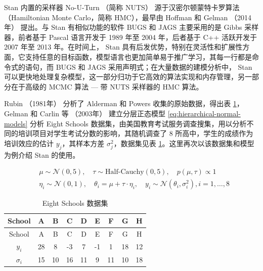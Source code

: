\documentclass[12pt,a4paper,UTF8,twoside]{book}
\theoremstyle{definition}
\theoremstyle{definition}
\theoremstyle{definition}
\theoremstyle{remark}
\begin{document}
Stan 内置的采样器 No-U-Turn （简称 NUTS） 源于汉密尔顿蒙特卡罗算法 （Hamiltonian Monte Carlo，简称 HMC），最早由 Hoffman 和 Gelman （2014年） \citep{hoffman2014} 提出。与 Stan 有相似功能的软件 BUGS 和 JAGS 主要采用的是 Gibbs 采样器，前者基于 Pascal 语言开发于 1989 年至 2004 年，后者基于 C++ 活跃开发于 2007 年至 2013 年。在时间上， Stan 具有后发优势，特别在灵活性和扩展性方面，它支持任意的目标函数，模型语言也更加简单易于推广学习，其每一行都是命令式的语句，而 BUGS 和 JAGS 采用声明式；在大量数据的建模分析中， Stan 可以更快地处理复杂模型，这一部分归功于它高效的算法实现和内存管理，另一部分在于高级的 MCMC 算法 --- 带 NUTS 采样器的 HMC 算法。

Rubin （1981年） \citep{Rubin1981} 分析了 Alderman 和 Powers \citep{Alderman1980} 收集的原始数据，得出表 \ref{tab:eight-high-schools}， Gelman 和 Carlin 等 （2003年） \citep{Gelman2003} 建立分层正态模型 \eqref{eq:hierarchical-normal-models} 分析 Eight Schools 数据集，由美国教育考试服务调查搜集，用以分析不同的培训项目对学生考试分数的影响，其随机调查了 8 所高中，学生的成绩作为培训效应的估计 \(y_j\)，其样本方差 \(\sigma^2_j\)，数据集见表 \ref{tab:eight-high-schools}。这里再次以该数据集和模型为例介绍 Stan 的使用。

\begin{equation}
\begin{aligned}
    &{} \mu \sim \mathcal{N}(0,5), \quad \tau \sim \text{Half-Cauchy}(0,5), \quad p(\mu,\tau) \propto 1 \\
    &{} \eta_i \sim \mathcal{N}(0,1), \quad
        \theta_i  =   \mu + \tau \cdot \eta_i, \quad 
        y_i \sim \mathcal{N}(\theta_i,\sigma^2_{i}), i = 1,\ldots,8
\end{aligned}
\label{eq:hierarchical-normal-models}
\end{equation}

\begin{longtable}[]{@{}ccccccccc@{}}
\caption{\label{tab:eight-high-schools} Eight Schools 数据集}\tabularnewline
\toprule
School & A & B & C & D & E & F & G & H\tabularnewline
\midrule
\endfirsthead
\toprule
School & A & B & C & D & E & F & G & H\tabularnewline
\midrule
\endhead
\(y_i\) & 28 & 8 & -3 & 7 & -1 & 1 & 18 & 12\tabularnewline
\(\sigma_i\) & 15 & 10 & 16 & 11 & 9 & 11 & 10 & 18\tabularnewline
\bottomrule
\end{longtable}
\end{document}
